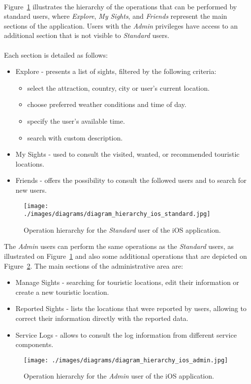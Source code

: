 \\
Figure~\ref{fig:iosStandardUserHierarchy} illustrates the hierarchy of the operations that can be performed by standard users, where \emph{Explore}, \emph{My Sights}, and \emph{Friends} represent the main sections of the application. Users with the \emph{Admin} privileges have access to an additional section that is not visible to \emph{Standard} users.\\
\\
Each section is detailed as follows:
\begin{itemize}
\item Explore - presents a list of sights, filtered by the following criteria:
  \begin{itemize}
    \item select the attraction, country, city or user's current location.
    \item choose preferred weather conditions and time of day.
    \item specify the user's available time.
    \item search with custom description.
  \end{itemize}
\item My Sights - used to consult the visited, wanted, or recommended touristic locations.
\item Friends - offers the possibility to consult the followed users and to search for new users.
\end{itemize}
\begin{figure}[h!]
 \centering
   \texttt{[image: ./images/diagrams/diagram\_hierarchy\_ios\_standard.jpg]}
   \caption{Operation hierarchy for the \emph{Standard} user of the iOS application.}
   \label{fig:iosStandardUserHierarchy}
\end{figure}
The \emph{Admin} users can perform the same operations as the \emph{Standard} users, as illustrated on Figure~\ref{fig:iosStandardUserHierarchy} and also some additional operations that are depicted on Figure~\ref{fig:iosAdminUserHierarchy}. The main sections of the administrative area are:
\begin{itemize}
\item Manage Sights - searching for touristic locations, edit their information or create a new touristic location.
\item Reported Sights - lists the locations that were reported by users, allowing to correct their information directly with the reported data.
\item Service Logs - allows to consult the log information from different service components.
\end{itemize}
\begin{figure}[h!]
 \centering
   \texttt{[image: ./images/diagrams/diagram\_hierarchy\_ios\_admin.jpg]}
   \caption{Operation hierarchy for the \emph{Admin} user of the iOS application.}
   \label{fig:iosAdminUserHierarchy}
\end{figure}
